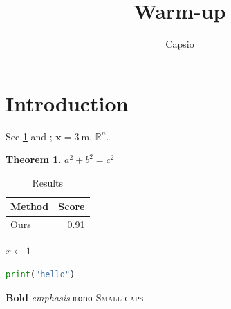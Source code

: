\documentclass[11pt]{article}
\title{Warm-up}
\author{Capsio}
\newtheorem{theorem}{Theorem}
\begin{document}
\maketitle
\begin{abstract}
\lipsum[1]
\end{abstract}
\section{Introduction}\label{sec:intro}
See \cref{sec:intro} and \citet{knuth1984}; $\bm{x} = \SI{3}{\metre}$, $\mathbb{R}^n$.
\begin{theorem}
$a^2 + b^2 = c^2$
\end{theorem}
\begin{table}[h]
\centering
\begin{tabular}{lr}
\toprule
Method & Score \\
\midrule
Ours & \num{0.91} \\
\bottomrule
\end{tabular}
\caption{Results}
\end{table}
\begin{algorithm}
\caption{Warm-up}
\begin{algorithmic}
\State $x \gets 1$
\end{algorithmic}
\end{algorithm}
\begin{lstlisting}[language=Python]
print("hello")
\end{lstlisting}
\textbf{Bold} \emph{emphasis} \texttt{mono} \textsc{Small caps}.


\end{document}
